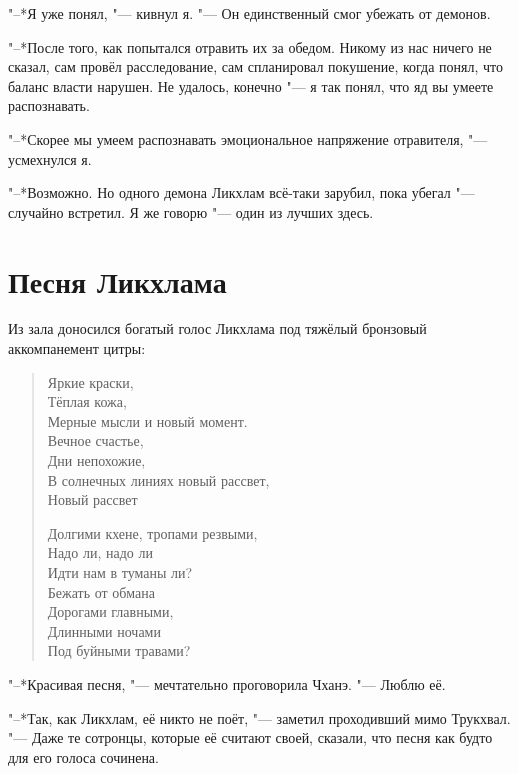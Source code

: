 \documentclass[a4paper,10pt,fleqn]{book}
\newcommand{\mulang}[3]{#2}%
\newcommand{\ldotst}{\so{...}\xspace}
\begin{document}
"--*Я уже понял, "--- кивнул я.
"--- Он единственный смог убежать от демонов.

"--*После того, как попытался отравить их за обедом.
Никому из нас ничего не сказал, сам провёл расследование, сам спланировал покушение, когда понял, что баланс власти нарушен.
Не удалось, конечно "--- я так понял, что яд вы умеете распознавать.

"--*Скорее мы умеем распознавать эмоциональное напряжение отравителя, "--- усмехнулся я.

"--*Возможно.
Но одного демона Ликхлам всё-таки зарубил, пока убегал "--- случайно встретил.
Я же говорю "--- один из лучших здесь.

\section{Песня Ликхлама}

Из зала доносился богатый голос Ликхлама под тяжёлый бронзовый аккомпанемент цитры:

\begin{verse}
\mulang{}{Яркие краски,}{Brightness of colors,}\\
\mulang{}{Тёплая кожа,}{Skin heated by arteries,}\\
\mulang{}{Мерные мысли и новый момент.}{Race of new moments, and rhythmical minds. }\\
\mulang{}{Вечное счастье,}{Edgeless happiness,}\\
\mulang{}{Дни непохожие,}{Different afternoons,}\\
\mulang{}{В солнечных линиях новый рассвет,}{Covered by sun rays renewed sunrise,}\\
\mulang{}{Новый рассвет\ldotst}{Renewed sunrise\dots}

Долгими кхене, тропами резвыми,\\
Надо ли, надо ли\\
Идти нам в туманы ли?\\
Бежать от обмана\\
Дорогами главными,\\
Длинными ночами\\
Под буйными травами?
\end{verse}

"--*Красивая песня, "--- мечтательно проговорила Чханэ.
"--- Люблю её.

"--*Так, как Ликхлам, её никто не поёт, "--- заметил проходивший мимо Трукхвал.
"--- Даже те сотронцы, которые её считают своей, сказали, что песня как будто для его голоса сочинена.
\end{document}
